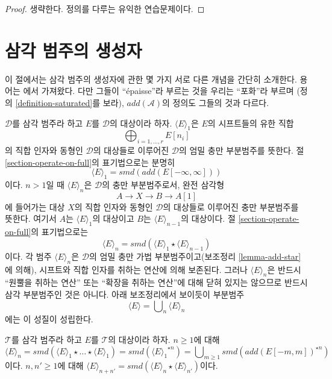 \begin{proof}
생략한다. 정의를 다루는 유익한 연습문제이다.
\end{proof}

\section{삼각 범주의 생성자}
\label{section-generators}

\noindent
이 절에서는 삼각 범주의 생성자에 관한 몇 가지 서로 다른 개념을
간단히 소개한다. 용어는 \cite{BvdB}에서 가져왔다. 다만 그들이
``\'epaisse''라 부르는 것을 우리는 ``포화''라 부르며
(정의 \ref{definition-saturated}를 보라), $add(\mathcal{A})$의 정의도
그들의 것과 다르다.

\medskip\noindent
$\mathcal{D}$를 삼각 범주라 하고 $E$를 $\mathcal{D}$의 대상이라 하자.
$\langle E \rangle_1$은 $E$의 시프트들의 유한 직합
$$
\bigoplus\nolimits_{i = 1, \ldots, r} E[n_i]
$$
의 직합 인자와 동형인 $\mathcal{D}$의 대상들로 이루어진
$\mathcal{D}$의 엄밀 충만 부분범주를 뜻한다. 절
\ref{section-operate-on-full}의 표기법으로는 분명히
$$
\langle E \rangle_1 = smd(add(E[-\infty, \infty]))
$$
이다. $n > 1$일 때 $\langle E \rangle_n$은 $\mathcal{D}$의 충만
부분범주로서, 완전 삼각형
$$
A \to X \to B \to A[1]
$$
에 들어가는 대상 $X$의 직합 인자와 동형인 $\mathcal{D}$의 대상들로
이루어진 충만 부분범주를 뜻한다. 여기서 $A$는
$\langle E \rangle_1$의 대상이고 $B$는 $\langle E \rangle_{n - 1}$의
대상이다. 절 \ref{section-operate-on-full}의 표기법으로는
$$
\langle E \rangle_n = smd(\langle E \rangle_1 \star \langle E \rangle_{n - 1})
$$
이다. 각 범주 $\langle E \rangle_n$은 $\mathcal{D}$의 엄밀 충만
가법 부분범주이고(보조정리 \ref{lemma-add-star}에 의해), 시프트와
직합 인자를 취하는 연산에 의해 보존된다. 그러나
$\langle E \rangle_n$은 반드시 ``원뿔을 취하는 연산'' 또는 ``확장을
취하는 연산''에 대해 닫혀 있지는 않으므로 반드시 삼각 부분범주인
것은 아니다. 아래 보조정리에서 보이듯이 부분범주
$$
\langle E \rangle = \bigcup\nolimits_n \langle E \rangle_n
$$
에는 이 성질이 성립한다.

\begin{lemma}
\label{lemma-generated-by-E-explicit}
$\mathcal{T}$를 삼각 범주라 하고 $E$를 $\mathcal{T}$의 대상이라 하자.
$n \geq 1$에 대해
$$
\langle E \rangle_n =
smd(\langle E \rangle_1 \star \ldots \star \langle E \rangle_1) =
smd({\langle E \rangle_1}^{\star n}) =
\bigcup\nolimits_{m \geq 1} smd(add(E[-m, m])^{\star n})
$$
이다. $n, n' \geq 1$에 대해 $\langle E \rangle_{n + n'} =
smd(\langle E \rangle_n \star \langle E \rangle_{n'})$이다.
\end{lemma}

